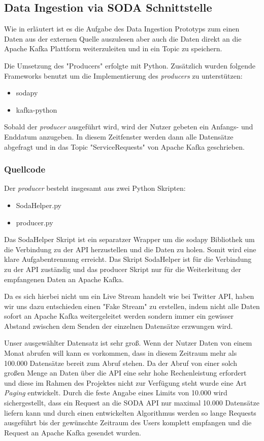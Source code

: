 \subsection{Data Ingestion via \acs{SODA} Schnittstelle}
Wie in  erläutert ist es die Aufgabe des Data Ingestion Prototyps zum einen Daten aus der externen Quelle auszulesen
aber auch die Daten direkt an die Apache Kafka Plattform weiterzuleiten und in ein Topic zu speichern.

Die Umsetzung des "Producers" erfolgte mit Python.
Zusätzlich wurden folgende Frameworks benutzt um die Implementierung des \textit{producers} zu unterstützen:

\begin{itemize}
  \item sodapy
  \item kafka-python
\end{itemize}

Sobald der \textit{producer} ausgeführt wird, wird der Nutzer gebeten ein Anfangs- und Enddatum anzugeben.
In diesem Zeitfenster werden dann alle Datensätze abgefragt und in das Topic "ServiceRequests" von Apache Kafka geschrieben.

\subsubsection{Quellcode}
Der \textit{producer} besteht insgesamt aus zwei Python Skripten:

\begin{itemize}
  \item SodaHelper.py
  \item producer.py
\end{itemize}

Das SodaHelper Skript ist ein separatzer Wrapper um die sodapy Bibliothek um die Verbindung zu der API herzustellen und die Daten zu holen.
Somit wird eine klare Aufgabentrennung erreicht.
Das Skript SodaHelper ist für die Verbindung zu der API zuständig und das producer Skript nur für die Weiterleitung der empfangenen Daten an Apache Kafka.

Da es sich hierbei nicht um ein Live Stream handelt wie \zb{} bei Twitter API, haben wir uns dazu entschieden einen "Fake Stream" zu erstellen,
indem nicht alle Daten sofort an Apache Kafka weitergeleitet werden sondern immer ein gewisser Abstand zwischen dem Senden der einzelnen Datensätze
erzwungen wird.

Unser ausgewählter Datensatz ist sehr groß. Wenn \zb{} der Nutzer Daten von einem Monat abrufen will kann es vorkommen, dass in diesem Zeitraum mehr als 100.000 Datensätze
bereit zum Abruf stehen.
Da der Abruf von einer solch großen Menge an Daten über die API eine sehr hohe Rechenleistung erfordert und diese im Rahmen des Projektes nicht zur Verfügung steht wurde
eine Art \textit{Paging} entwickelt.
Durch die feste Angabe eines Limits von 10.000 wird sichergestellt, dass ein Request an die \ac{SODA} \ac{API} nur maximal 10.000
Datensätze liefern kann und durch einen entwickelten Algorithmus werden so lange Requests ausgeführt bis der gewünschte Zeitraum des Users komplett empfangen und
die Request an Apache Kafka gesendet wurden.

